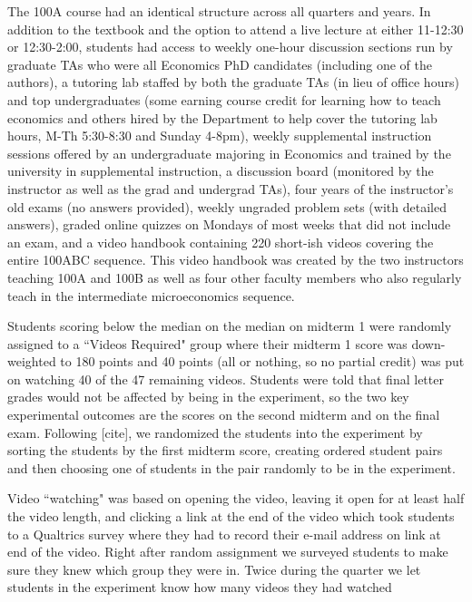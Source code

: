 \documentclass[12pt]{article}
\begin{document}
The 100A course had an identical structure across all quarters and years. In addition to the textbook and the option to attend a live lecture at either 11-12:30 or 12:30-2:00, students had access to weekly one-hour discussion sections run by graduate TAs who were all Economics PhD candidates (including one of the authors), a tutoring lab staffed by both the graduate TAs (in lieu of office hours) and top undergraduates (some earning course credit for learning how to teach economics and others hired by the Department to help cover the tutoring lab hours, M-Th 5:30-8:30 and Sunday 4-8pm), weekly supplemental instruction sessions offered by an undergraduate majoring in Economics and trained by the university in supplemental instruction, a discussion board (monitored by the instructor as well as the grad and undergrad TAs), four years of the instructor's old exams (no answers provided), weekly ungraded problem sets (with detailed answers), graded online quizzes on Mondays of most weeks that did not include an exam, and a video handbook containing 220 short-ish videos covering the entire 100ABC sequence. This video handbook was created by the two instructors teaching 100A and 100B as well as four other faculty members who also regularly teach in the intermediate microeconomics sequence.

Students scoring below the median on the median on midterm 1 were randomly assigned to a ``Videos Required" group where their midterm 1 score was down-weighted to 180 points and 40 points (all or nothing, so no partial credit) was put on watching 40 of the 47 remaining videos. Students were told that final letter grades would not be affected by being in the experiment, so the two key experimental outcomes are the scores on the second midterm and on the final exam. Following [cite], we randomized the students into the experiment by sorting the students by the first midterm score, creating ordered student pairs and then choosing one of students in the pair randomly to be in the experiment.

Video ``watching" was based on opening the video, leaving it open for at least half the video length, and clicking a link at the end of the video which took students to a Qualtrics survey where they had to record their e-mail address on link at end of the video. Right after random assignment we surveyed students to make sure they knew which group they were in. Twice during the quarter we let students in the experiment know how many videos they had watched
\end{document}
